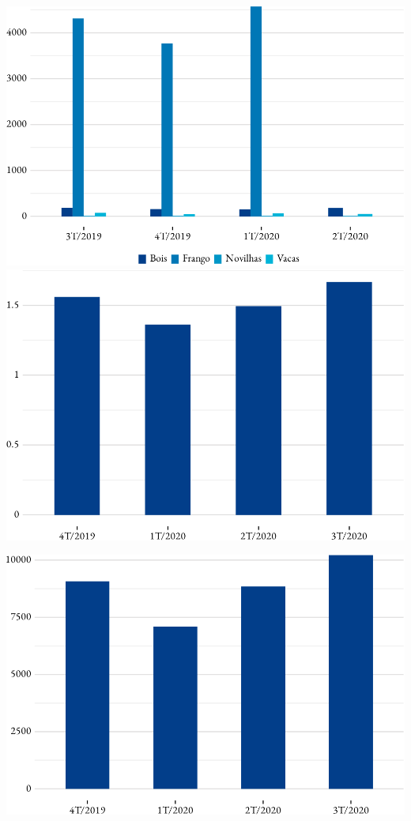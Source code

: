 \includegraphics{fig/abates-1.pdf}
\includegraphics{fig/galinha_poedeiras-1.pdf}

\includegraphics{fig/ovos_galinha-1.pdf}

